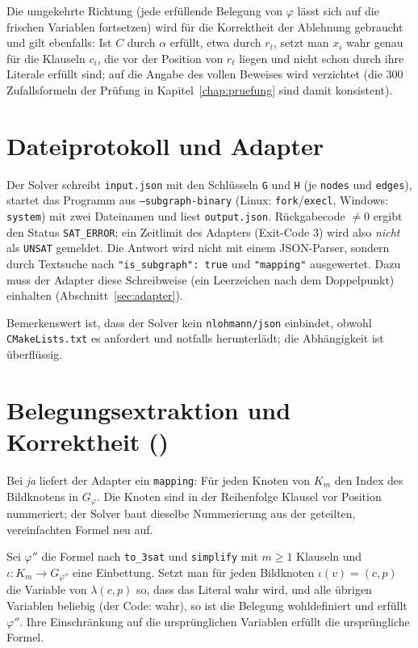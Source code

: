 Die umgekehrte Richtung (jede erfüllende Belegung von $\varphi$ lässt sich auf die frischen Variablen fortsetzen) wird für die Korrektheit der Ablehnung gebraucht und gilt ebenfalls: Ist $C$ durch $\alpha$ erfüllt, etwa durch $r_t$, setzt man $x_i$ wahr genau für die Klauseln $c_i$, die vor der Position von $r_t$ liegen und nicht schon durch ihre Literale erfüllt sind; auf die Angabe des vollen Beweises wird verzichtet (die 300 Zufallsformeln der Prüfung in Kapitel~\ref{chap:pruefung} sind damit konsistent).

\section{Dateiprotokoll und Adapter}
\label{sec:solver_protokoll}

Der Solver schreibt \texttt{input.json} mit den Schlüsseln \texttt{G} und \texttt{H} (je \texttt{nodes} und \texttt{edges}), startet das Programm aus \texttt{--subgraph-binary} (Linux: \texttt{fork}/\texttt{execl}, Windows: \texttt{system}) mit zwei Dateinamen und liest \texttt{output.json}. Rückgabecode $\ne 0$ ergibt den Status \texttt{SAT\_ERROR}; ein Zeitlimit des Adapters (Exit-Code $3$) wird also \emph{nicht} als \texttt{UNSAT} gemeldet. Die Antwort wird nicht mit einem JSON-Parser, sondern durch Textsuche nach \texttt{"is\_subgraph": true} und \texttt{"mapping"} ausgewertet. Dazu muss der Adapter diese Schreibweise (ein Leerzeichen nach dem Doppelpunkt) einhalten (Abschnitt~\ref{sec:adapter}).

Bemerkenswert ist, dass der Solver kein \texttt{nlohmann/json} einbindet, obwohl \texttt{CMakeLists.txt} es anfordert und notfalls herunterlädt; die Abhängigkeit ist überflüssig.

\section{Belegungsextraktion und Korrektheit ()}
\label{sec:solver_extraktion}

Bei \emph{ja} liefert der Adapter ein \texttt{mapping}: Für jeden Knoten von $K_m$ den Index des Bildknotens in $G_\varphi$. Die Knoten sind in der Reihenfolge Klausel vor Position nummeriert; der Solver baut dieselbe Nummerierung aus der geteilten, vereinfachten Formel neu auf.

\begin{satz}
	\label{satz:extraktion}
	Sei $\varphi''$ die Formel nach \texttt{to\_3sat} und \texttt{simplify} mit $m\ge1$ Klauseln und $\iota:K_m\to G_{\varphi''}$ eine Einbettung. Setzt man für jeden Bildknoten $\iota(v)=(c,p)$ die Variable von $\lambda(c,p)$ so, dass das Literal wahr wird, und alle übrigen Variablen beliebig (der Code: wahr), so ist die Belegung wohldefiniert und erfüllt $\varphi''$. Ihre Einschränkung auf die ursprünglichen Variablen erfüllt die ursprüngliche Formel.
\end{satz}

